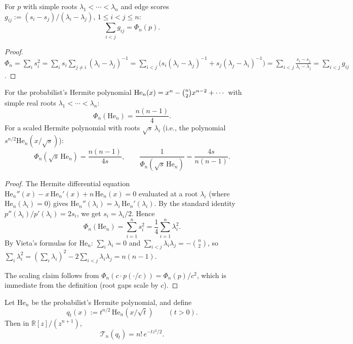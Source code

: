 
\begin{lemma}\label{lem:q4-edge-score}
For $p$ with simple roots $\lambda_1<\cdots<\lambda_n$ and edge scores
$g_{ij}:=(s_i-s_j)/(\lambda_i-\lambda_j)$, $1\le i<j\le n$:
\[
\sum_{i<j}g_{ij}=\Phi_n(p).
\]
\end{lemma}

\begin{proof}
$\Phi_n=\sum_i s_i^2
=\sum_i s_i\sum_{j\ne i}(\lambda_i-\lambda_j)^{-1}
=\sum_{i<j}\bigl(s_i(\lambda_i-\lambda_j)^{-1}+s_j(\lambda_j-\lambda_i)^{-1}\bigr)
=\sum_{i<j}\frac{s_i-s_j}{\lambda_i-\lambda_j}
=\sum_{i<j}g_{ij}$.
\end{proof}

\begin{lemma}\label{lem:q4-hermite-phi}
For the probabilist's Hermite polynomial
$\mathrm{He}_n(x)=x^n-\tbinom{n}{2}x^{n-2}+\cdots$
with simple real roots $\lambda_1<\cdots<\lambda_n$:
\[
\Phi_n(\mathrm{He}_n)=\frac{n(n-1)}{4}.
\]
For a scaled Hermite polynomial with roots $\sqrt{s}\,\lambda_i$
(i.e., the polynomial $s^{n/2}\mathrm{He}_n(x/\sqrt{s})$):
\[
\Phi_n(\sqrt{s}\,\mathrm{He}_n)=\frac{n(n-1)}{4s},
\qquad
\frac{1}{\Phi_n(\sqrt{s}\,\mathrm{He}_n)}=\frac{4s}{n(n-1)}.
\]
\end{lemma}

\begin{proof}
The Hermite differential equation
$\mathrm{He}_n''(x)-x\,\mathrm{He}_n'(x)+n\,\mathrm{He}_n(x)=0$
evaluated at a root $\lambda_i$ (where $\mathrm{He}_n(\lambda_i)=0$) gives
$\mathrm{He}_n''(\lambda_i)=\lambda_i\,\mathrm{He}_n'(\lambda_i)$.
By the standard identity $p''(\lambda_i)/p'(\lambda_i)=2s_i$,
we get $s_i=\lambda_i/2$.
Hence
\[
\Phi_n(\mathrm{He}_n)
=\sum_{i=1}^n s_i^2
=\frac{1}{4}\sum_{i=1}^n\lambda_i^2.
\]
By Vieta's formulas for $\mathrm{He}_n$:
$\sum_i\lambda_i=0$ and $\sum_{i<j}\lambda_i\lambda_j=-\binom{n}{2}$,
so
$\sum_i\lambda_i^2=(\sum_i\lambda_i)^2-2\sum_{i<j}\lambda_i\lambda_j=n(n-1)$.

The scaling claim follows from $\Phi_n(c\cdot p(\cdot/c))=\Phi_n(p)/c^2$,
which is immediate from the definition (root gaps scale by $c$).
\end{proof}

\begin{lemma}\label{lem:q4-hermite-transform}
Let $\mathrm{He}_n$ be the probabilist's Hermite polynomial, and define
\[
q_t(x):=t^{n/2}\,\mathrm{He}_n(x/\sqrt t)\qquad (t>0).
\]
Then in $\mathbb R[z]/(z^{n+1})$,
\[
\mathcal T_n(q_t)=n!\,e^{-t z^2/2}.
\]
\end{lemma}

